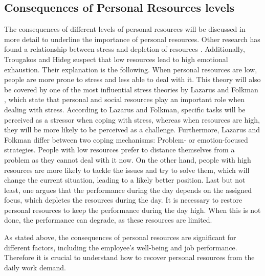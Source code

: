 \documentclass{hasel_thesis}
\begin{document}
\subsection{Consequences of Personal Resources levels}
The consequences of different levels of personal resources will be discussed in more detail to underline the importance of personal resources. 
Other research has found a relationship between stress and depletion of resources \cite{Sonnentag.2001}. Additionally, Trougakos and Hideg \cite{Trougakos.2009} suspect that low resources lead to high emotional exhaustion. Their explanation is the following. When personal resources are low, people are more prone to stress and less able to deal with it. This theory will also be covered by one of the most influential stress theories by Lazarus and Folkman \cite{Lazarus.1984}, which state that personal and social resources play an important role when dealing with stress. According to Lazarus and Folkman, specific tasks will be perceived as a stressor when coping with stress, whereas when resources are high, they will be more likely to be perceived as a challenge.
Furthermore, Lazarus and Folkman \cite{Lazarus.1984} differ between two coping mechanisms: Problem- or emotion-focused strategies. People with low resources prefer to distance themselves from a problem as they cannot deal with it now. On the other hand, people with high resources are more likely to tackle the issues and try to solve them, which will change the current situation, leading to a likely better position.
Last but not least, one argues that the performance during the day depends on the assigned focus, which depletes the resources during the day. It is necessary to restore personal resources to keep the performance during the day high. When this is not done, the performance can degrade\cite{Trougakos.2009}, as these resources are limited.

As stated above, the consequences of personal resources are significant for different factors, including the employee's well-being and job performance. Therefore it is crucial to understand how to recover personal resources from the daily work demand.
 
\end{document}
